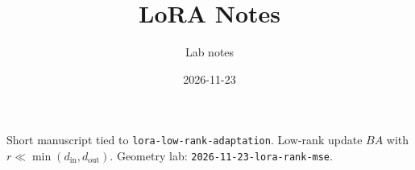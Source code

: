 \documentclass[11pt]{article}
\title{LoRA Notes}
\author{Lab notes}
\date{2026-11-23}
\begin{document}
\maketitle

\noindent Short manuscript tied to \texttt{lora-low-rank-adaptation}.
Low-rank update $BA$ with $r \ll \min(d_{\mathrm{in}},d_{\mathrm{out}})$.
Geometry lab: \texttt{2026-11-23-lora-rank-mse}.
\end{document}

